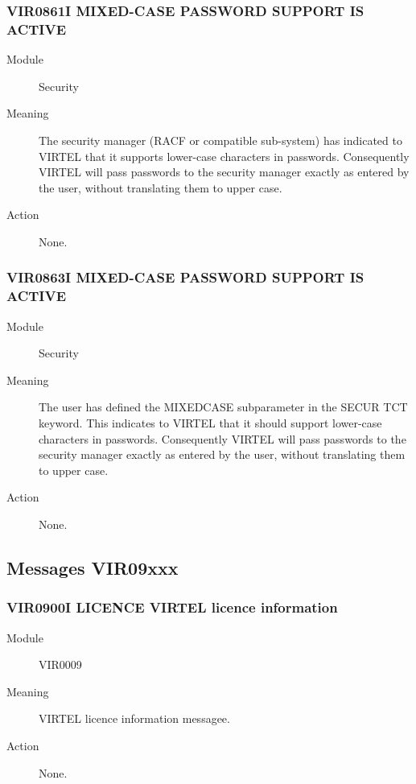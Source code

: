 \documentclass[letterpaper,10pt,english]{sphinxmanual}
\begin{document}
\subsubsection{VIR0861I MIXED-CASE PASSWORD SUPPORT IS ACTIVE}
\label{\detokenize{messages:vir0861i-mixed-case-password-support-is-active}}\begin{description}
\item[{Module}] \leavevmode
Security

\item[{Meaning}] \leavevmode
The security manager (RACF or compatible sub-system) has indicated to VIRTEL that it supports lower-case characters in passwords. Consequently VIRTEL will pass passwords to the security manager exactly as entered by the user, without translating them to upper case.

\item[{Action}] \leavevmode
None.

\end{description}


\subsubsection{VIR0863I MIXED-CASE PASSWORD SUPPORT IS ACTIVE}
\label{\detokenize{messages:vir0863i-mixed-case-password-support-is-active}}\begin{description}
\item[{Module}] \leavevmode
Security

\item[{Meaning}] \leavevmode
The user has defined the MIXEDCASE subparameter in the SECUR TCT keyword. This indicates to VIRTEL that it should support lower-case characters in passwords. Consequently VIRTEL will pass passwords to the security manager exactly as entered by the user, without translating them to upper case.

\item[{Action}] \leavevmode
None.

\end{description}


\subsection{Messages VIR09xxx}
\label{\detokenize{messages:messages-vir09xxx}}

\subsubsection{VIR0900I LICENCE VIRTEL licence information}
\label{\detokenize{messages:vir0900i-licence-virtel-licence-information}}\begin{description}
\item[{Module}] \leavevmode
VIR0009

\item[{Meaning}] \leavevmode
VIRTEL licence information messagee.

\item[{Action}] \leavevmode
None.

\end{description}
\end{document}
